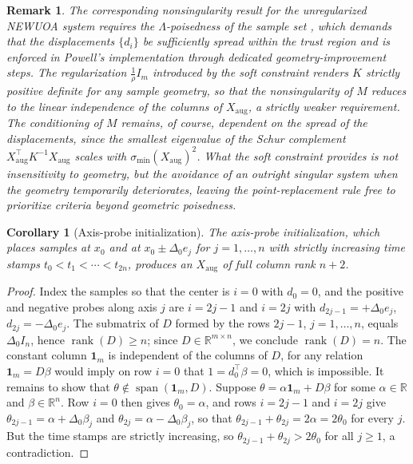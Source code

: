\documentclass[11pt,a4paper]{article}
\newcommand{\R}{\mathbb{R}}
\newtheorem{corollary}[theorem]{Corollary}
\newtheorem{remark}[theorem]{Remark}
\begin{document}
\begin{remark}\label{rem:lambda-poised}
The corresponding nonsingularity result for the unregularized NEWUOA
system requires the $\Lambda$-poisedness of the sample set
\cite{ConnScheinbergVicente2009}, which demands that the
displacements $\{d_i\}$ be sufficiently spread within the trust
region and is enforced in Powell's implementation through dedicated
geometry-improvement steps. The regularization $\tfrac{1}{\rho}I_m$
introduced by the soft constraint renders $K$ strictly positive
definite for any sample geometry, so that the nonsingularity of $M$
reduces to the linear independence of the columns of
$X_{\mathrm{aug}}$, a strictly weaker requirement. The conditioning
of $M$ remains, of course, dependent on the spread of the
displacements, since the smallest eigenvalue of the Schur complement
$X_{\mathrm{aug}}^\top K^{-1} X_{\mathrm{aug}}$ scales with
$\sigma_{\min}(X_{\mathrm{aug}})^2$. What the soft constraint
provides is not insensitivity to geometry, but the avoidance of an
outright singular system when the geometry temporarily deteriorates,
leaving the point-replacement rule free to prioritize criteria
beyond geometric poisedness.
\end{remark}

\begin{corollary}[Axis-probe initialization]\label{cor:init-rank}
The axis-probe initialization, which places samples at $x_0$ and at
$x_0 \pm \Delta_0 e_j$ for $j = 1,\dots,n$ with strictly increasing
time stamps $t_0 < t_1 < \cdots < t_{2n}$, produces an
$X_{\mathrm{aug}}$ of full column rank $n+2$.
\end{corollary}

\begin{proof}
Index the samples so that the center is $i = 0$ with $d_0 = 0$, and
the positive and negative probes along axis $j$ are $i = 2j-1$ and
$i = 2j$ with $d_{2j-1} = +\Delta_0 e_j$,
$d_{2j} = -\Delta_0 e_j$. The submatrix of $D$ formed by the rows
$2j-1$, $j = 1, \dots, n$, equals $\Delta_0 I_n$, hence
$\operatorname{rank}(D) \ge n$; since $D \in \R^{m\times n}$, we
conclude $\operatorname{rank}(D) = n$. The constant column
$\mathbf{1}_m$ is independent of the columns of $D$, for any
relation $\mathbf{1}_m = D\beta$ would imply on row $i = 0$ that
$1 = d_0^\top \beta = 0$, which is impossible. It remains to show
that $\theta \notin \operatorname{span}(\mathbf{1}_m,D)$. Suppose
$\theta = \alpha \mathbf{1}_m + D\beta$ for some $\alpha \in \R$ and
$\beta \in \R^n$. Row $i = 0$ then gives $\theta_0 = \alpha$, and
rows $i = 2j-1$ and $i = 2j$ give
$\theta_{2j-1} = \alpha + \Delta_0\beta_j$ and
$\theta_{2j} = \alpha - \Delta_0\beta_j$, so that
$\theta_{2j-1} + \theta_{2j} = 2\alpha = 2\theta_0$ for every $j$.
But the time stamps are strictly increasing, so
$\theta_{2j-1} + \theta_{2j} > 2\theta_0$ for all $j \ge 1$, a
contradiction.
\end{proof}
\end{document}
